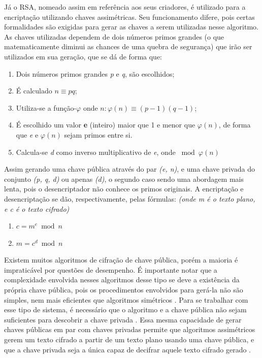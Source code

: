 	Já o RSA, nomeado assim em referência aos seus criadores, é utilizado para a encriptação utilizando chaves assimétricas. Seu funcionamento difere, pois certas formalidades são exigidas para gerar as chaves a serem utilizadas nesse algoritmo. As chaves utilizadas dependem de dois números primos grandes (o que matematicamente diminui as chances de uma quebra de segurança) que irão ser utilizados em sua geração, que se dá de forma que:
	
	\begin{enumerate}
		\item Dois números primos grandes \textit{p} e \textit{q}, são escolhidos;
		\item É calculado $n \equiv pq$;
		\item Utiliza-se a função-$\varphi$ onde $n: \varphi(n) \equiv (p-1)(q-1)$;
		\item É escolhido um valor \textbf{e} (inteiro) maior que 1 e menor que $\varphi(n)$, de forma que \textit{e} e $\varphi(n)$ sejam primos entre si.
		\item Calcula-se \textit{d} como inverso multiplicativo de \textit{e}, onde $\bmod{\varphi(n)}$
	\end{enumerate}
	
	Assim gerando uma chave pública através do par \textit{(e, n)}, e uma chave privada do conjunto \textit{(p, q, d)} ou apenas \textit{(d)}, o segundo caso sendo uma abordagem mais lenta, pois o desencriptador não conhece os primos originais. A encriptação e desencriptação se dão, respectivamente, pelas fórmulas: \textit{(onde m é o texto plano, e c é o texto cifrado)}
	
	\begin{enumerate}
		\item $c = m^e \bmod{n}$
		\item $m = c^d \bmod{n}$
	\end{enumerate}
	
	Existem muitos algoritmos de cifração de chave pública, porém a maioria é impraticável por questões de desempenho. É importante notar que a complexidade envolvida nesses algoritmos desse tipo se deve a existência da própria chave pública, pois os procedimentos envolvidos para gerá-la não são simples, nem mais eficientes que algoritmos simétricos \cite{stallings11}. Para se trabalhar com esse tipo de sistema, é necessário que o algoritmo e a chave pública não sejam suficientes para descobrir a chave privada \cite{pkcs8}. Essa mesma capacidade de gerar chaves públicas em par com chaves privadas permite que algoritmos assimétricos gerem um texto cifrado a partir de um texto plano usando uma chave pública, e que a chave privada seja a única capaz de decifrar aquele texto cifrado gerado \cite{pkcs1}.
	
